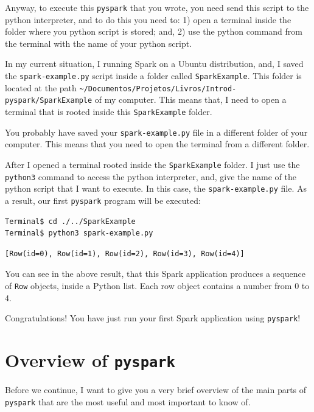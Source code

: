 \documentclass[
  11pt,
  letterpaper,
  DIV=11,
  numbers=noendperiod]{scrreprt}
\begin{document}
Anyway, to execute this \texttt{pyspark} that you wrote, you need send
this script to the python interpreter, and to do this you need to: 1)
open a terminal inside the folder where you python script is stored;
and, 2) use the python command from the terminal with the name of your
python script.

In my current situation, I running Spark on a Ubuntu distribution, and,
I saved the \texttt{spark-example.py} script inside a folder called
\texttt{SparkExample}. This folder is located at the path
\texttt{\textasciitilde{}/Documentos/Projetos/Livros/Introd-pyspark/SparkExample}
of my computer. This means that, I need to open a terminal that is
rooted inside this \texttt{SparkExample} folder.

You probably have saved your \texttt{spark-example.py} file in a
different folder of your computer. This means that you need to open the
terminal from a different folder.

After I opened a terminal rooted inside the \texttt{SparkExample}
folder. I just use the \texttt{python3} command to access the python
interpreter, and, give the name of the python script that I want to
execute. In this case, the \texttt{spark-example.py} file. As a result,
our first \texttt{pyspark} program will be executed:

\begin{verbatim}
Terminal$ cd ./../SparkExample
Terminal$ python3 spark-example.py
\end{verbatim}

\begin{verbatim}
[Row(id=0), Row(id=1), Row(id=2), Row(id=3), Row(id=4)]
\end{verbatim}

You can see in the above result, that this Spark application produces a
sequence of \texttt{Row} objects, inside a Python list. Each row object
contains a number from 0 to 4.

Congratulations! You have just run your first Spark application using
\texttt{pyspark}!

\hypertarget{overview-of-pyspark}{%
\section{\texorpdfstring{Overview of
\texttt{pyspark}}{Overview of pyspark}}\label{overview-of-pyspark}}

Before we continue, I want to give you a very brief overview of the main
parts of \texttt{pyspark} that are the most useful and most important to
know of.
\end{document}

